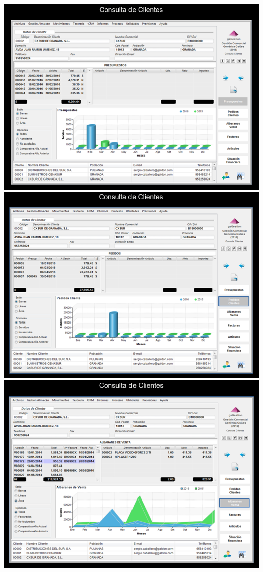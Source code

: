 \documentclass{article}
\begin{document}
\begin{itemize}
\begin{flushleft}
	\includegraphics[scale=0.65]{imagenes/CapturasoftwareSaaS1d.png}
	\includegraphics[scale=0.65]{imagenes/CapturasoftwareSaaS1e.png}
	\includegraphics[scale=0.65]{imagenes/CapturasoftwareSaaS1f.png}

\end{flushleft}
\end{itemize}
\end{document}
